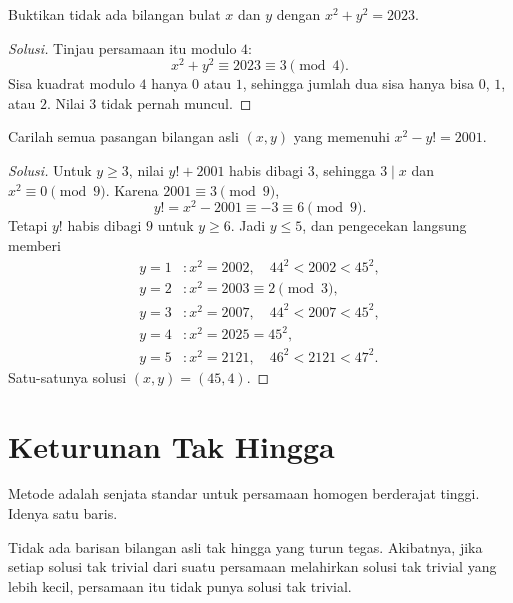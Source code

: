 \documentclass[12pt]{scrartcl}
\begin{document}
\begin{example}
Buktikan tidak ada bilangan bulat $x$ dan $y$ dengan $x^2 + y^2 = 2023$.
\end{example}
\begin{proof}[Solusi]
Tinjau persamaan itu modulo $4$:
\[ x^2 + y^2 \equiv 2023 \equiv 3 \pmod{4}. \]
Sisa kuadrat modulo $4$ hanya $0$ atau $1$,
sehingga jumlah dua sisa hanya bisa $0$, $1$, atau $2$.
Nilai $3$ tidak pernah muncul.
\end{proof}

\begin{example}
Carilah semua pasangan bilangan asli $(x, y)$ yang memenuhi $x^2 - y! = 2001$.
\end{example}
\begin{proof}[Solusi]
Untuk $y \ge 3$, nilai $y! + 2001$ habis dibagi $3$,
sehingga $3 \mid x$ dan $x^2 \equiv 0 \pmod{9}$.
Karena $2001 \equiv 3 \pmod{9}$,
\[ y! = x^2 - 2001 \equiv -3 \equiv 6 \pmod{9}. \]
Tetapi $y!$ habis dibagi $9$ untuk $y \ge 6$.
Jadi $y \le 5$, dan pengecekan langsung memberi
\begin{align*}
y = 1 &: x^2 = 2002, \quad 44^2 < 2002 < 45^2, \\
y = 2 &: x^2 = 2003 \equiv 2 \pmod{3}, \\
y = 3 &: x^2 = 2007, \quad 44^2 < 2007 < 45^2, \\
y = 4 &: x^2 = 2025 = 45^2, \\
y = 5 &: x^2 = 2121, \quad 46^2 < 2121 < 47^2.
\end{align*}
Satu-satunya solusi $(x, y) = (45, 4)$.
\end{proof}

\section{Keturunan Tak Hingga}

Metode  adalah senjata standar
untuk persamaan homogen berderajat tinggi. Idenya satu baris.

\begin{fact}
Tidak ada barisan bilangan asli tak hingga yang turun tegas.
Akibatnya, jika setiap solusi tak trivial dari suatu persamaan melahirkan
solusi tak trivial yang lebih kecil, persamaan itu tidak punya solusi tak trivial.
\end{fact}
\end{document}
